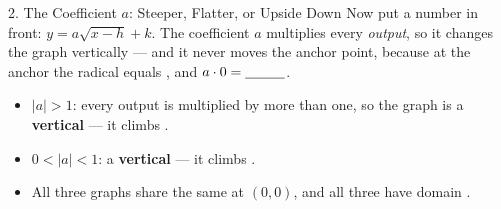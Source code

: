 \documentclass[10pt]{article}
\newcommand{\lgrid}[4]{%
  \draw[step=1, linegray!40, very thin] (#1,#3) grid (#2,#4);
  \draw[->, semithick, charcoal] (#1,0)--(#2,0) node[below right, font=\scriptsize]{$x$};
  \draw[->, semithick, charcoal] (0,#3)--(0,#4) node[left, font=\scriptsize]{$y$};}
\begin{document}
\begin{notesbox}{2. The Coefficient $a$: Steeper, Flatter, or Upside Down}
Now put a number in front: $y=a\sqrt{x-h}+k$. The coefficient $a$ multiplies every \emph{output},
so it changes the graph vertically --- and it never moves the anchor point, because at the anchor the
radical equals \blank{1.0cm}, and $a\cdot 0 = \blank{1.0cm}$.
\begin{center}
\begin{minipage}[c]{0.46\linewidth}
\centering
{}
\end{minipage}
\hfill
\begin{minipage}[c]{0.50\linewidth}
\small
\begin{itemize}[leftmargin=1.3em, itemsep=4pt]
  \item $|a|>1$: every output is multiplied by more than one, so the graph is a \textbf{vertical
        \blank{2.0cm}} --- it climbs \blank{1.8cm}.
  \item $0<|a|<1$: a \textbf{vertical \blank{2.4cm}} --- it climbs \blank{1.8cm}.
  \item All three graphs share the same \blank{2.4cm} at $(0,0)$, and all three have domain
        \blank{1.8cm}.
\end{itemize}
\end{minipage}
\end{center}


\end{notesbox}
\end{document}
